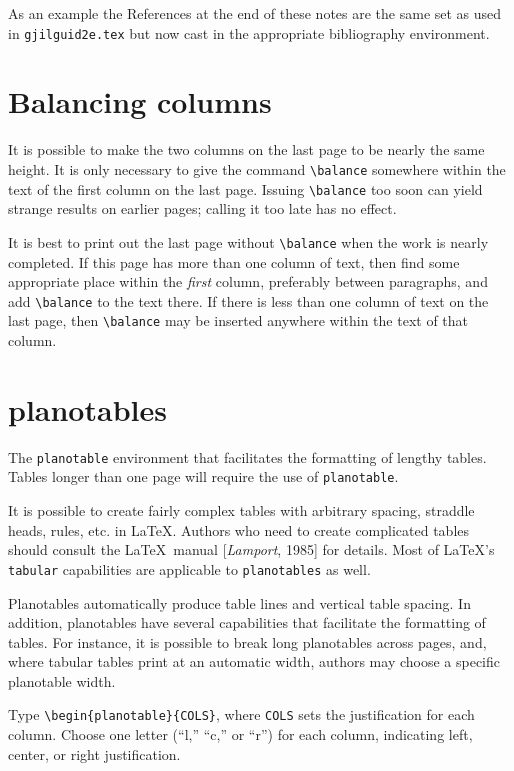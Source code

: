 \documentclass[extra,mreferee]{gji}
\begin{document}
As an example the References at the end of these notes are
the same set as used in \verb"gjilguid2e.tex"
but now cast in the appropriate bibliography environment.

\section{Balancing columns}
It is possible to make the two columns on the last page to be nearly the
same height. It is only necessary to give the command \verb!\balance!
somewhere within the text of the first column on the last page. Issuing
\verb!\balance! too soon can yield strange results on earlier pages;
calling it too late has no effect.

It is best to print out the last page without \verb!\balance! when the
work is nearly completed. If this page has more than one column of text,
then find some appropriate place within the {\em first\/} column,
preferably between paragraphs, and add \verb!\balance! to the text there.
If there is less than one column of text on the last page, then
\verb!\balance! may be inserted anywhere within the text of that column.

\section{planotables}
The {\tt planotable} environment that facilitates the
formatting of lengthy tables. Tables longer than
one page will require the use of {\tt planotable}.

It is possible to create fairly complex tables with
arbitrary spacing, straddle heads, rules, etc. in \LaTeX.
Authors who need to create complicated tables should
consult the \LaTeX\ manual [{\it Lamport}, 1985] for
details.  Most of \LaTeX's {\tt tabular} capabilities
are applicable to {\tt planotables} as well.

Planotables automatically produce table lines and
vertical table spacing.
In addition, planotables have several capabilities that
facilitate the formatting of tables.  For instance,
it is possible to break long planotables across pages,
and, where tabular tables print at an automatic width,
authors may choose a specific planotable width.

Type \verb"\begin{planotable}{COLS}",
where {\tt COLS}
sets the justification for each column.
Choose one letter (``l,'' ``c,'' or ``r'') for each
column, indicating left, center, or right justification.
\end{document}
